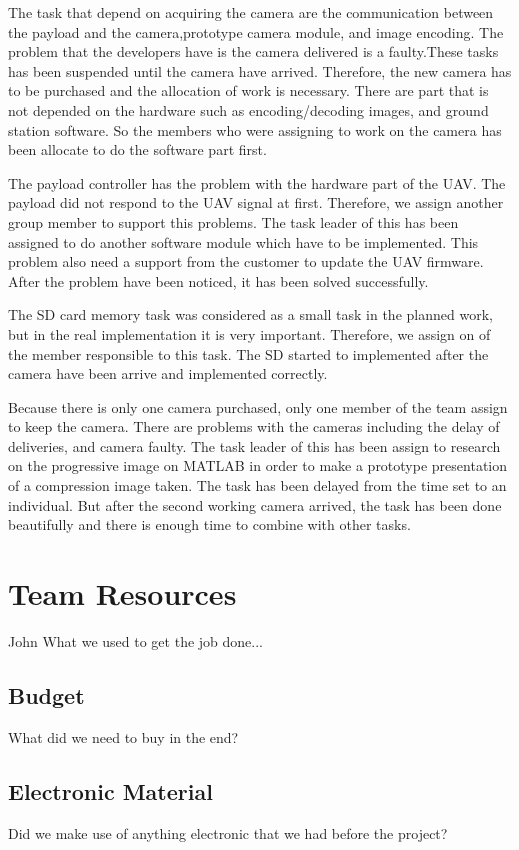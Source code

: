 \documentclass[oneside]{ecsgdp}         %
\begin{document}
The task that depend on acquiring the camera are the communication between the payload and the camera,prototype camera module, and image encoding. The problem that the developers have is the camera delivered is a faulty.These tasks has been suspended until the camera have arrived.  Therefore, the new camera has to be purchased and the allocation of work is necessary. There are part that is not depended on the hardware such as encoding/decoding images, and ground station software. So the members who were assigning to work on the camera has been allocate to do the software part first.

The payload controller has the problem with the hardware part of the UAV. The payload did not respond to the UAV signal at first. Therefore, we assign another group member to support this problems. The task leader of this has been assigned to do another software module which have to be implemented. This problem also need a support from the customer to update the UAV firmware. After the problem have been noticed, it has been solved successfully. 

The SD card memory task was considered as a small task in the planned work, but in the real implementation it is very important. Therefore, we assign on of the member responsible to this task. The SD started to implemented after the camera have been arrive and implemented correctly. 

Because there is only one camera purchased, only one member of the team assign to keep the camera. There are problems with the cameras including the delay of deliveries, and camera faulty. The task leader of this has been assign to research on the progressive image on MATLAB in order to make a prototype presentation of a compression image taken. The task has been delayed from the time set to an individual. But after the second working camera arrived, the task has been done beautifully and there is enough time to combine with other tasks.

\section{Team Resources}
John
What we used to get the job done...

\subsection{Budget}
What did we need to buy in the end?

\subsection{Electronic Material}
Did we make use of anything electronic that we had before the project?
\end{document}
